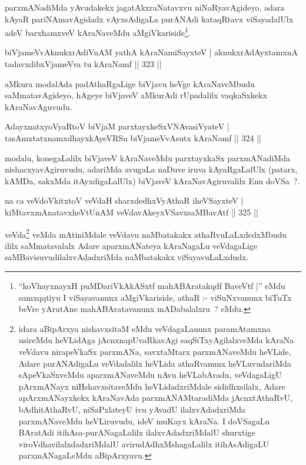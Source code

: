 \begin{artha}
parxmANadiMda yAvudakekx jagatAkxraNatavxvu niNaRyavAgideyo, adara kAyaR pariNAmavAgidadx vAyxsAdigaLa purANAdi kataqRtavx viSayadalUlx adeV barxhamxveV kAraNaveMdu aMgiVkariside\footnote{``koVhayxnayxH puMDariVkAkASxtf mahABAratakqdf BaveVtf |'' eMdu samxqqtiyu I viSayavanunx aMgiVkariside, athaR :- viSuNxvanunx biTuTx beVre yArutAne mahABAratavanunx mADabalalxru~? eMdu.}.
\end{artha}


\begin{shl}
biVjameVvAknukxrAdiVnAM yathA kAraNamiSayxteV |
aknukxrAdAyxtamxnA tadavxdibxVjameVva tu kAraNamf \hfill || 323 ||
\end{shl}

\begin{artha}
aMkura modalAda padAthaRgaLige biVjavu heVge kAraNaveMbudu saMmatavAgideyo, hAgeye biVjaveV aMkurAdi rUpadalilx vaqkaSxkekx kAraNavAguvudu.
\end{artha}

		\begin{shl}
AdayxnatxyoVyaRtoV biVjaM parxtayxkeSxVNAvasiVyateV |
tasAmxtatxnamxdhayxkAyeVRSu biVjameVvAsutx kAraNamf \hfill || 324 ||
\end{shl}

\begin{artha}
modalu, konegaLalilx biVjaveV kAraNaveMdu parxtayxkaSx parxmANadiMda nishacxyavAgiruvudu, adariMda avugaLa naDuve iruva kAyaRgaLalUlx (patarx, kAMDa, sakxMda itAyxdigaLalUlx) biVjaveV kAraNavAgiruvalilx Enu doVSa~?.
\end{artha}


\begin{shl}
na ca veVdoVkitxtoV veVdaH sharxdedhxVyAthaR iheVSayxteV |
kiMtavxmAnatavxheVtUnAM veVdavAkeyxVSavxsaMBavAtf \hfill || 325 ||
\end{shl}

\begin{artha}
veVda\footnote{idara aBipArxya \mdash nishavxsitaM eMdu veVdagaLanunx paramAtamxna usireMdu heVLidAga jAcnxnapUvaRkavAgi saqSiTxyAgilalxveMda kAraNa veVdavu nirapeVkaSx parxmANa, savxtaMtarx parxmANaveMdu heVLide, Adare purANAdigaLu veVdadalilx heVLida athaRvanunx heVLuvudariMda sApeVkaSxveMdu aparxmANaveMdu nAvu heVLabAradu, veVdagaLigU pArxmANayx niHshavxsitaveMdu heVLidadxriMdale sididhxsilalx, Adare apArxmANayxkekx kAraNavAda parxmANAMtaradiMda jAcnxtAthaRvU, bAdhitAthaRvU, niSaPxlateyU ivu yAvadU ilalxvAdadxriMda parxmANaveMdu heVLiruvudu, ideV muKayx kAraNa. I doVSagaLu BAratAdi itihAsa-purANagaLalilx ilalxvAdadxriMdalU shurxtige viroVdhavilalxdadxriMdalU avirudAdhxMshagaLalilx itihAsAdigaLU parxmANagaLeMdu aBipArxyavu.} veMda mAtiniMdale veVdavu naMbatakakx athaRvuLaLxdedxMbudu ililx saMmatavalalx Adare aparxmANateya kAraNagaLu veVdagaLige saMBavisuvudilalxvAdadxriMda naMbatakakx viSayavuLaLxdudx.
\end{artha}

